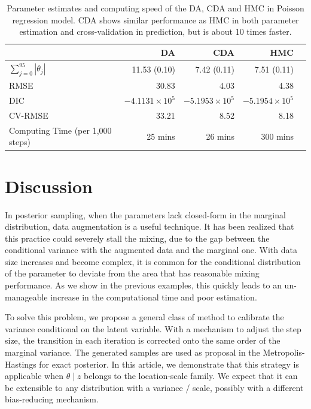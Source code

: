 \documentclass[10pt]{article}
\begin{document}
\begin{table}[H]
\centering
\begin{tabular}{|l |r |r| r| r |} 
 \hline
                          & DA & CDA & HMC\\
 [0.5ex]
 \hline
$\sum_{j=0}^{95} |\theta_j|$         & 11.53 (0.10)&  7.42 (0.11)  & 7.51 (0.11)  \\
RMSE                              & 30.83        & 4.03          & 4.38\\
DIC                                 & $-4.1131 \times 10^5$     & $-5.1953 \times 10^5$      & $-5.1954 \times 10^5$\\
CV-RMSE                           & 33.21        & 8.52          & 8.18\\
Computing Time (per 1,000 steps)  & 25 mins       & 26 mins        & 300 mins\\
 \hline
\end{tabular}
\caption{Parameter estimates and computing speed of the DA, CDA and HMC in Poisson regression model. CDA shows similar performance as HMC in both parameter estimation and cross-validation in prediction, but is about 10 times faster.}
\label{table:Poisson}
\end{table}

\section{Discussion}

In posterior sampling, when the parameters lack closed-form in the marginal distribution, data augmentation is a useful technique. It has been realized that this practice could severely stall the mixing, due to the gap between the conditional variance with the augmented data and the marginal one. With data size increases and become complex, it is common for the conditional distribution of the parameter to deviate from the area that has reasonable mixing performance. As we show in the previous examples, this quickly leads to an un-manageable increase in the computational time and poor estimation.

To solve this problem, we propose a general class of method to calibrate the variance conditional on the latent variable. With a mechanism to adjust the step size, the transition in each iteration is corrected onto the same order of the marginal variance. The generated samples are used as proposal in the Metropolis-Hastings for exact posterior. In this article, we demonstrate that this strategy is applicable when $\theta \mid z$ belongs to the location-scale family. We expect that it can be extensible to any distribution with a variance / scale, possibly with a different bias-reducing mechanism.
\end{document}
